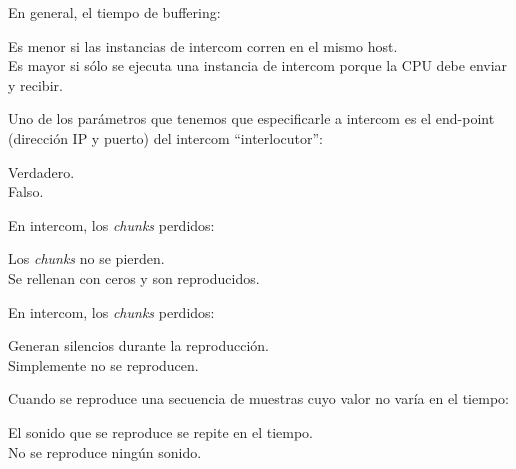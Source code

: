 \documentclass[legalpaper, 12pt, addpoints]{exam}
\begin{document}
\begin{questions}
\vspace{0.10in}

\question En general, el tiempo de buffering:

\begin{oneparchoices}
  \choice Es menor si las instancias de intercom corren en el mismo host.\\
  \choice Es mayor si sólo se ejecuta una instancia de intercom porque la CPU debe enviar y recibir.
\end{oneparchoices}
  
\vspace{0.10in}

\question Uno de los parámetros que tenemos que especificarle a
intercom es el end-point (dirección IP y puerto) del intercom
``interlocutor'':

\begin{oneparchoices}
  \choice Verdadero.\\
  \choice Falso.
\end{oneparchoices}
  
\vspace{0.10in}

\question En intercom, los \emph{chunks} perdidos:

\begin{oneparchoices}
  \choice Los \emph{chunks} no se pierden.\\
  \choice Se rellenan con ceros y son reproducidos.
\end{oneparchoices}
  
\vspace{0.10in}

\question En intercom, los \emph{chunks} perdidos:

\begin{oneparchoices}
  \choice Generan silencios durante la reproducción.\\
  \choice Simplemente no se reproducen.
\end{oneparchoices}
  
\vspace{0.10in}

\question Cuando se reproduce una secuencia de muestras cuyo valor no varía en el tiempo:

\begin{oneparchoices}
  \choice El sonido que se reproduce se repite en el tiempo.\\
  \choice No se reproduce ningún sonido.
\end{oneparchoices}
  

\end{questions}
\end{document}
